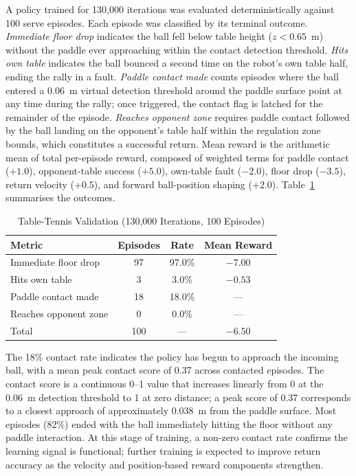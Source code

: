\documentclass[11pt, a4paper]{article}
\begin{document}
A policy trained for 130,000 iterations was evaluated deterministically against 100 serve episodes. Each episode was classified by its terminal outcome. \emph{Immediate floor drop} indicates the ball fell below table height ($z < 0.65$~m) without the paddle ever approaching within the contact detection threshold. \emph{Hits own table} indicates the ball bounced a second time on the robot's own table half, ending the rally in a fault. \emph{Paddle contact made} counts episodes where the ball entered a 0.06~m virtual detection threshold around the paddle surface point at any time during the rally; once triggered, the contact flag is latched for the remainder of the episode. \emph{Reaches opponent zone} requires paddle contact followed by the ball landing on the opponent's table half within the regulation zone bounds, which constitutes a successful return. Mean reward is the arithmetic mean of total per-episode reward, composed of weighted terms for paddle contact ($+1.0$), opponent-table success ($+5.0$), own-table fault ($-2.0$), floor drop ($-3.5$), return velocity ($+0.5$), and forward ball-position shaping ($+2.0$). Table~\ref{tab:tt_results} summarises the outcomes.

\begin{table}[H]
\centering
\caption{Table-Tennis Validation (130,000 Iterations, 100 Episodes)}
\label{tab:tt_results}
\begin{tabular}{@{} l c c c @{}}
\toprule
\textbf{Metric} & \textbf{Episodes} & \textbf{Rate} & \textbf{Mean Reward} \\
\midrule
Immediate floor drop  & 97 & 97.0\% & $-7.00$ \\
Hits own table        & 3  & 3.0\%  & $-0.53$ \\
Paddle contact made   & 18 & 18.0\% & ---     \\
Reaches opponent zone & 0  & 0.0\%  & ---     \\
\hline
Total                 & 100 & --- & $-6.50$ \\
\bottomrule
\end{tabular}
\end{table}

The 18\% contact rate indicates the policy has begun to approach the incoming ball, with a mean peak contact score of 0.37 across contacted episodes. The contact score is a continuous 0--1 value that increases linearly from 0 at the 0.06~m detection threshold to 1 at zero distance; a peak score of 0.37 corresponds to a closest approach of approximately 0.038~m from the paddle surface. Most episodes (82\%) ended with the ball immediately hitting the floor without any paddle interaction. At this stage of training, a non-zero contact rate confirms the learning signal is functional; further training is expected to improve return accuracy as the velocity and position-based reward components strengthen.
\end{document}

